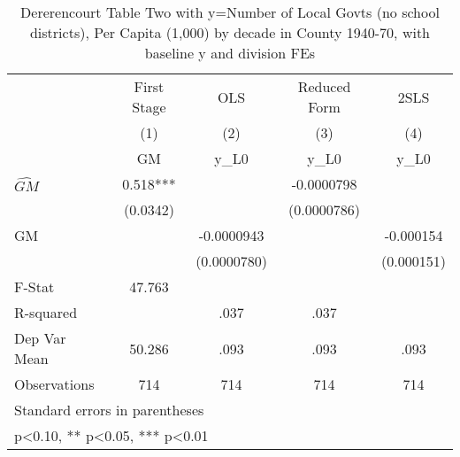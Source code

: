 \begin{table}[htbp]\centering
\def\sym#1{\ifmmode^{#1}\else\(^{#1}\)\fi}
\caption{Dererencourt Table Two with y=Number of Local Govts (no school districts), Per Capita (1,000) by decade in County 1940-70, with baseline y and division FEs}
\begin{tabular}{l*{4}{c}}
\toprule
                    & First Stage   &         OLS   &Reduced Form   &        2SLS   \\
                    &\multicolumn{1}{c}{(1)}&\multicolumn{1}{c}{(2)}&\multicolumn{1}{c}{(3)}&\multicolumn{1}{c}{(4)}\\
                    &\multicolumn{1}{c}{GM}&\multicolumn{1}{c}{y\_L0}&\multicolumn{1}{c}{y\_L0}&\multicolumn{1}{c}{y\_L0}\\
\midrule
$\hat{GM}$          &       0.518***&               &  -0.0000798   &               \\
                    &    (0.0342)   &               & (0.0000786)   &               \\
\addlinespace
GM                  &               &  -0.0000943   &               &   -0.000154   \\
                    &               & (0.0000780)   &               &  (0.000151)   \\
\midrule
F-Stat              &      47.763   &               &               &               \\
R-squared           &               &        .037   &        .037   &               \\
Dep Var Mean        &      50.286   &        .093   &        .093   &        .093   \\
Observations        &         714   &         714   &         714   &         714   \\
\bottomrule
\multicolumn{5}{l}{\footnotesize Standard errors in parentheses}\\
\multicolumn{5}{l}{\footnotesize * p<0.10, ** p<0.05, *** p<0.01}\\
\end{tabular}
\end{table}
